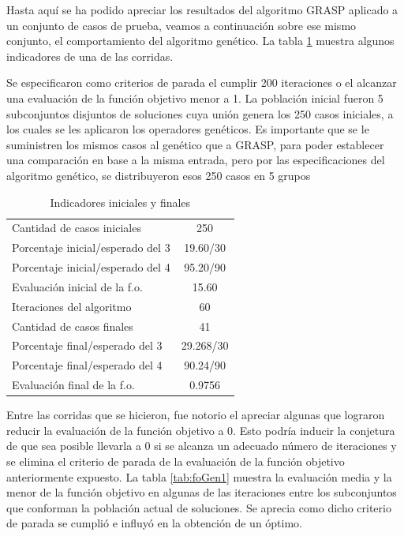\documentclass[a4paper,12pt]{book}
\begin{document}
	Hasta aquí se ha podido apreciar los resultados del algoritmo GRASP aplicado a un conjunto de casos de prueba, veamos a continuación sobre ese mismo conjunto, el comportamiento del algoritmo genético. La tabla \ref{tab:IndicadoresGen1} muestra algunos indicadores de una de las corridas.
	
	Se especificaron como criterios de parada el cumplir 200 iteraciones o el alcanzar una evaluación de la función objetivo menor a 1. La población inicial fueron 5 subconjuntos disjuntos de soluciones cuya unión genera los 250 casos iniciales, a los cuales se les aplicaron los operadores genéticos. Es importante que se le suministren los mismos casos al genético que a GRASP, para poder establecer una comparación en base a la misma entrada, pero por las especificaciones del algoritmo genético, se distribuyeron esos 250 casos en 5 grupos
	
	\begin{table}[h]
		\begin{center}
			\begin{tabular}{| l | c |} \hline
				Cantidad de casos iniciales & 250 \\
				Porcentaje inicial/esperado del 3 & 19.60/30 \\
				Porcentaje inicial/esperado del 4 & 95.20/90 \\
				Evaluación inicial de la f.o. & 15.60 \\ \hline
				Iteraciones del algoritmo & 60 \\ \hline
				Cantidad de casos finales & 41 \\
				Porcentaje final/esperado del 3 & 29.268/30 \\
				Porcentaje final/esperado del 4 & 90.24/90 \\
				Evaluación final de la f.o. & 0.9756 \\ \hline
			\end{tabular}
			\caption{Indicadores iniciales y finales}
			\label{tab:IndicadoresGen1}
		\end{center}
	\end{table}

	Entre las corridas que se hicieron, fue notorio el apreciar algunas que lograron reducir la evaluación de la función objetivo a 0. Esto podría inducir la conjetura de que sea posible llevarla a 0 si se alcanza un adecuado número de iteraciones y se elimina el criterio de parada de la evaluación de la función objetivo anteriormente expuesto. La tabla \ref{tab:foGen1} muestra la evaluación media y la menor de la función objetivo en algunas de las iteraciones entre los subconjuntos que conforman la población actual de soluciones. Se aprecia como dicho criterio de parada se cumplió e influyó en la obtención de un óptimo.
\end{document}
